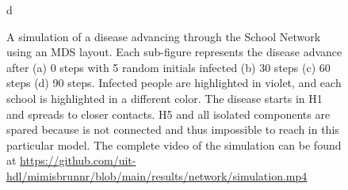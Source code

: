 \begin{figure}[ht]
\begin{minipage}[b]{0.45\linewidth}
        \caption{d}
    \end{minipage}
    \caption{A simulation of a disease advancing through the School Network using an MDS layout. Each sub-figure represents the disease advance after (a) 0 steps with 5 random initials infected (b) 30 steps (c) 60 steps (d) 90 steps. Infected people are highlighted in violet, and each school is highlighted in a different color. The disease starts in H1 and spreads to closer contacts. H5 and all isolated components are spared because is not connected and thus impossible to reach in this particular model. The complete video of the simulation can be found at \url{https://github.com/uit-hdl/mimisbrunnr/blob/main/results/network/simulation.mp4}}
    \label{fig:networkVideo}
\end{figure}


